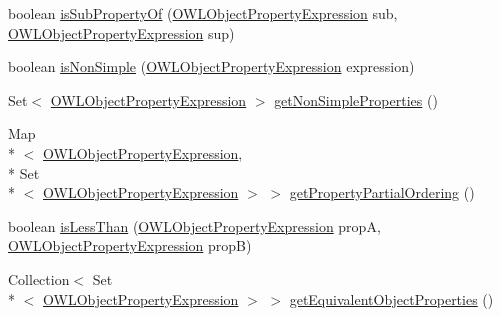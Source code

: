 \begin{DoxyCompactItemize}
\item 
boolean \hyperlink{classorg_1_1semanticweb_1_1owlapi_1_1util_1_1_o_w_l_object_property_manager_ad5e2e5525086fc6ecc87cb5e19857395}{is\-Sub\-Property\-Of} (\hyperlink{interfaceorg_1_1semanticweb_1_1owlapi_1_1model_1_1_o_w_l_object_property_expression}{O\-W\-L\-Object\-Property\-Expression} sub, \hyperlink{interfaceorg_1_1semanticweb_1_1owlapi_1_1model_1_1_o_w_l_object_property_expression}{O\-W\-L\-Object\-Property\-Expression} sup)
\item 
boolean \hyperlink{classorg_1_1semanticweb_1_1owlapi_1_1util_1_1_o_w_l_object_property_manager_ad28c2cb0c17f85719b41f6ad62dc28b4}{is\-Non\-Simple} (\hyperlink{interfaceorg_1_1semanticweb_1_1owlapi_1_1model_1_1_o_w_l_object_property_expression}{O\-W\-L\-Object\-Property\-Expression} expression)
\item 
Set$<$ \hyperlink{interfaceorg_1_1semanticweb_1_1owlapi_1_1model_1_1_o_w_l_object_property_expression}{O\-W\-L\-Object\-Property\-Expression} $>$ \hyperlink{classorg_1_1semanticweb_1_1owlapi_1_1util_1_1_o_w_l_object_property_manager_a3f51edf251dc3a9020460eaa0f18b091}{get\-Non\-Simple\-Properties} ()
\item 
Map\\*
$<$ \hyperlink{interfaceorg_1_1semanticweb_1_1owlapi_1_1model_1_1_o_w_l_object_property_expression}{O\-W\-L\-Object\-Property\-Expression}, \\*
Set\\*
$<$ \hyperlink{interfaceorg_1_1semanticweb_1_1owlapi_1_1model_1_1_o_w_l_object_property_expression}{O\-W\-L\-Object\-Property\-Expression} $>$ $>$ \hyperlink{classorg_1_1semanticweb_1_1owlapi_1_1util_1_1_o_w_l_object_property_manager_a8d6d2988b92a9da9fcfb0dca224d9fa5}{get\-Property\-Partial\-Ordering} ()
\item 
boolean \hyperlink{classorg_1_1semanticweb_1_1owlapi_1_1util_1_1_o_w_l_object_property_manager_a3e4559bc561a574d4826bad7d41dfc66}{is\-Less\-Than} (\hyperlink{interfaceorg_1_1semanticweb_1_1owlapi_1_1model_1_1_o_w_l_object_property_expression}{O\-W\-L\-Object\-Property\-Expression} prop\-A, \hyperlink{interfaceorg_1_1semanticweb_1_1owlapi_1_1model_1_1_o_w_l_object_property_expression}{O\-W\-L\-Object\-Property\-Expression} prop\-B)
\item 
Collection$<$ Set\\*
$<$ \hyperlink{interfaceorg_1_1semanticweb_1_1owlapi_1_1model_1_1_o_w_l_object_property_expression}{O\-W\-L\-Object\-Property\-Expression} $>$ $>$ \hyperlink{classorg_1_1semanticweb_1_1owlapi_1_1util_1_1_o_w_l_object_property_manager_ac4f547deb1aefb68358b566817adce61}{get\-Equivalent\-Object\-Properties} ()
\end{DoxyCompactItemize}
